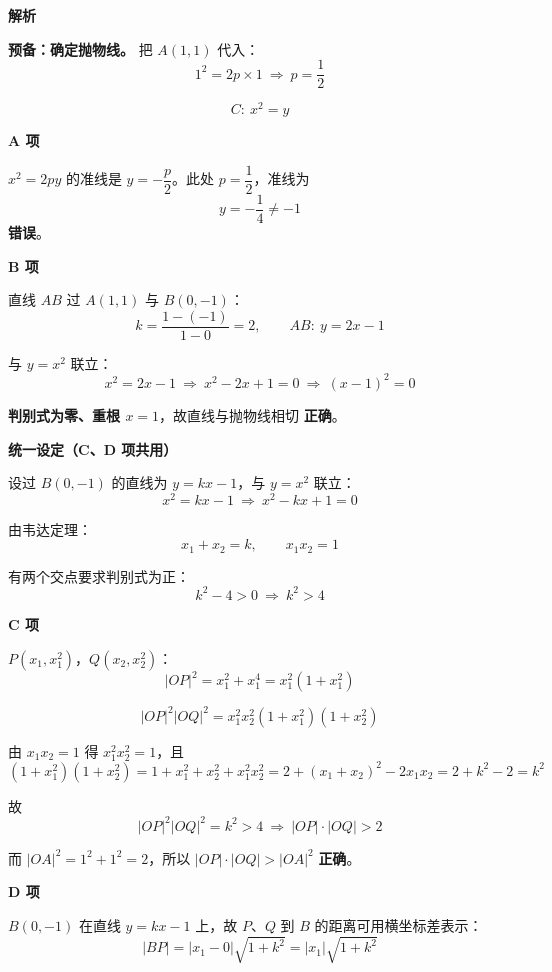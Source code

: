\textbf{解析}

\textbf{预备：确定抛物线。} 把 $A(1,1)$ 代入：
\[1^{2}=2p\times1\ \Longrightarrow\ p=\frac12\]

\[C:\ x^{2}=y\]

\par\medskip

\textbf{A 项 }

$x^{2}=2py$ 的准线是 $y=-\dfrac p2$。此处 $p=\dfrac12$，准线为
\[y=-\frac14\ne-1\]
 \textbf{错误}。

\par\medskip

\textbf{B 项 }

直线 $AB$ 过 $A(1,1)$ 与 $B(0,-1)$：
\[k=\frac{1-(-1)}{1-0}=2,\qquad AB:\ y=2x-1\]

与 $y=x^{2}$ 联立：
\[x^{2}=2x-1\ \Longrightarrow\ x^{2}-2x+1=0\ \Longrightarrow\ (x-1)^{2}=0\]

\textbf{判别式为零、重根 $x=1$}，故直线与抛物线相切  \textbf{正确}。

\par\medskip

\textbf{统一设定（C、D 项共用）}

设过 $B(0,-1)$ 的直线为 $y=kx-1$，与 $y=x^{2}$ 联立：
\[x^{2}=kx-1\ \Longrightarrow\ x^{2}-kx+1=0\]

由韦达定理：
\[x_1+x_2=k,\qquad x_1x_2=1\]

有两个交点要求判别式为正：
\[k^{2}-4>0\ \Longrightarrow\ k^{2}>4\]

\par\medskip

\textbf{C 项 }

$P\left(x_1,x_1^{2}\right)$，$Q\left(x_2,x_2^{2}\right)$：
\[|OP|^{2}=x_1^{2}+x_1^{4}=x_1^{2}\left(1+x_1^{2}\right)\]

\[|OP|^{2}|OQ|^{2}=x_1^{2}x_2^{2}\left(1+x_1^{2}\right)\left(1+x_2^{2}\right)\]

由 $x_1x_2=1$ 得 $x_1^{2}x_2^{2}=1$，且
\[\left(1+x_1^{2}\right)\left(1+x_2^{2}\right)=1+x_1^{2}+x_2^{2}+x_1^{2}x_2^{2}=2+\left(x_1+x_2\right)^{2}-2x_1x_2=2+k^{2}-2=k^{2}\]

故
\[|OP|^{2}|OQ|^{2}=k^{2}>4\ \Longrightarrow\ |OP|\cdot|OQ|>2\]

而 $|OA|^{2}=1^{2}+1^{2}=2$，所以 $|OP|\cdot|OQ|>|OA|^{2}$  \textbf{正确}。

\par\medskip

\textbf{D 项 }

$B(0,-1)$ 在直线 $y=kx-1$ 上，故 $P$、$Q$ 到 $B$ 的距离可用横坐标差表示：
\[|BP|=\left|x_1-0\right|\sqrt{1+k^{2}}=\left|x_1\right|\sqrt{1+k^{2}}\]

